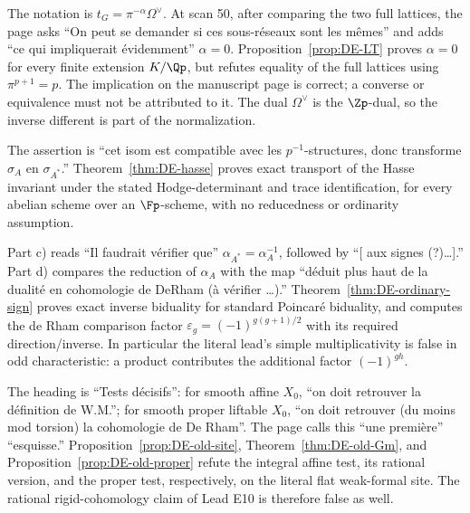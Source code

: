 \begin{remark}\label{rem:DE-quote-E7}
The notation is $t_G=\pi^{-\alpha}\Omega^\vee$.  At scan 50, after comparing the two full lattices, the page asks ``On peut se demander si ces sous-réseaux sont les mêmes'' and adds ``ce qui impliquerait évidemment'' $\alpha=0$.  Proposition~\ref{prop:DE-LT} proves $\alpha=0$ for every finite extension $K/\Qp$, but refutes equality of the full lattices using $\pi^{p+1}=p$.  The implication on the manuscript page is correct; a converse or equivalence must not be attributed to it.  The dual $\Omega^\vee$ is the $\Zp$-dual, so the inverse different is part of the normalization.
\end{remark}

\begin{remark}\label{rem:DE-quote-E8}
The assertion is ``cet isom est compatible avec les $p^{-1}$-structures, donc transforme $\sigma_A$ en $\sigma_{A^*}$.''  Theorem~\ref{thm:DE-hasse} proves exact transport of the Hasse invariant under the stated Hodge-determinant and trace identification, for every abelian scheme over an $\Fp$-scheme, with no reducedness or ordinarity assumption.
\end{remark}

\begin{remark}\label{rem:DE-quote-E9}
Part c) reads ``Il faudrait vérifier que'' $\alpha_{A^*}=\alpha_A^{-1}$, followed by ``[ aux signes (?)\ldots].''  Part d) compares the reduction of $\alpha_A$ with the map ``déduit plus haut de la dualité en cohomologie de DeRham (à vérifier \ldots).''  Theorem~\ref{thm:DE-ordinary-sign} proves exact inverse biduality for standard Poincaré biduality, and computes the de Rham comparison factor
$\varepsilon_g=(-1)^{g(g+1)/2}$ with its required direction/inverse.  In particular the literal lead's simple multiplicativity is false in odd characteristic: a product contributes the additional factor $(-1)^{gh}$.
\end{remark}

\begin{remark}\label{rem:DE-quote-E10}
The heading is ``Tests décisifs'': for smooth affine $X_0$, ``on doit retrouver la définition de W.M.''; for smooth proper liftable $X_0$, ``on doit retrouver (du moins mod torsion) la cohomologie de De Rham''.  The page calls this ``une première'' ``esquisse.''  Proposition~\ref{prop:DE-old-site}, Theorem~\ref{thm:DE-old-Gm}, and Proposition~\ref{prop:DE-old-proper} refute the integral affine test, its rational version, and the proper test, respectively, on the literal flat weak-formal site.  The rational rigid-cohomology claim of Lead E10 is therefore false as well.
\end{remark}

